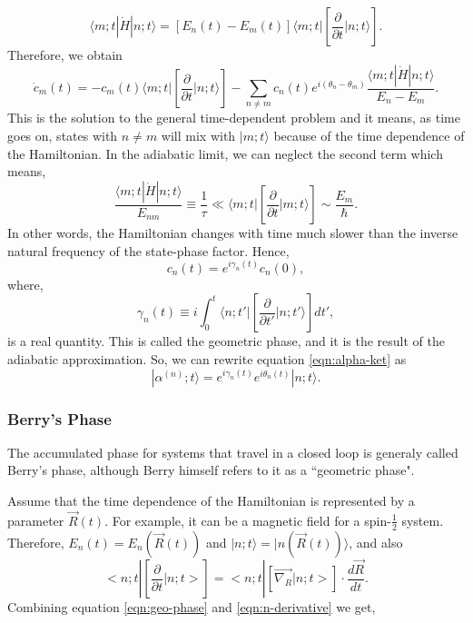 \begin{equation}
\langle m;t|\dot{H}|n;t \rangle =\left[ E_n(t)-E_m(t)\right] \langle m;t| \left[ \frac{\partial}{\partial t} |n;t \rangle \right] .
\end{equation}
%
Therefore, we obtain
%
\begin{equation}
\dot{c}_m(t) =-c_m(t) \langle m;t| \left[ \frac{\partial}{\partial t} |n;t \rangle \right]-\sum_{n\neq m}c_n(t) e^{i(\theta_n-\theta_m)} \frac{ \langle m;t|\dot{H}|n;t \rangle }{E_n-E_m} .
\end{equation}
%
This is the solution to the general time-dependent problem and it
means, as time goes on, states with $n \neq m$ will mix with
$|m;t \rangle $ because of the time dependence of the Hamiltonian. In
the adiabatic limit, we can neglect the second term which means,
%
\begin{equation}
\frac{ \langle m;t|\dot{H}|n;t \rangle }{E_{nm}} \equiv \frac{1}{\tau} \ll \langle m;t| \left[ \frac{\partial}{\partial t} |m;t \rangle \right] \sim \frac{E_m}{\hbar} .
\end{equation}
%
In other words, the Hamiltonian changes with time much slower than the
inverse natural frequency of the state-phase factor.  Hence,
%
\begin{equation}
c_n(t)=e^{i \gamma_n(t)} c_n(0) ,
\end{equation}
%
where,
%
\begin{equation}
\label{eqn:geo-phase}
\gamma_n(t) \equiv i \int_0^t \langle n;t'| \left[ \frac{\partial}{\partial t'} |n;t' \rangle   \right] dt' ,
\end{equation}
is a real quantity. This is called the geometric phase, and it is the
result of the adiabatic approximation.  So, we can rewrite equation
\ref{eqn:alpha-ket} as
%
\begin{equation}
|\alpha^{(n)};t \rangle= e^{i \gamma_n(t)} e^{i \theta_n(t)} |n;t \rangle .
\end{equation}

\subsubsection{Berry's Phase}

The accumulated phase for systems that travel in a closed loop is
generaly called Berry's phase, although Berry himself refers to it as
a ``geometric phase".

Assume that the time dependence of the Hamiltonian is represented by a
parameter $\vec{R}(t)$. For example, it can be a magnetic field for a
spin-$\frac{1}{2}$ system. Therefore, $E_n(t)=E_n(\vec{R}(t))$ and
$|n;t \rangle =|n(\vec{R}(t))\rangle$, and also
%
\begin{equation}
\label{eqn:n-derivative}
<n;t| \left[\frac{\partial}{\partial t} |n;t>\right]=<n;t|\left[\vec{\nabla_R}|n;t>\right]\cdot\frac{d\vec{R}}{dt} .
\end{equation}
%
Combining equation \ref{eqn:geo-phase} and \ref{eqn:n-derivative} we
get,
 
